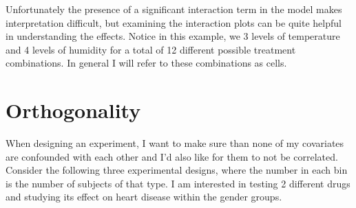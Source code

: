 \documentclass[]{book}
\theoremstyle{definition}
\theoremstyle{definition}
\theoremstyle{remark}
\begin{document}
Unfortunately the presence of a significant interaction term in the
model makes interpretation difficult, but examining the interaction
plots can be quite helpful in understanding the effects. Notice in this
example, we 3 levels of temperature and 4 levels of humidity for a total
of 12 different possible treatment combinations. In general I will refer
to these combinations as cells.

\section{Orthogonality}\label{orthogonality}

When designing an experiment, I want to make sure than none of my
covariates are confounded with each other and I'd also like for them to
not be correlated. Consider the following three experimental designs,
where the number in each bin is the number of subjects of that type. I
am interested in testing 2 different drugs and studying its effect on
heart disease within the gender groups.
\end{document}
